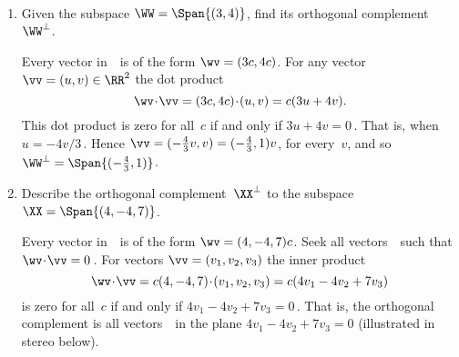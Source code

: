 \begin{example} \label{eg:orthsubsp}
\ 
\begin{enumerate}
\item\label{eg:orthsubsp:a} Given the subspace \(\WW=\Span\{(3,4)\}\), find its orthogonal complement \(\WW^\perp\). 
\begin{solution} 
Every vector in~\WW\ is of the form \(\wv=(3c,4c)\).
%
For any vector \(\vv=(u,v)\in\RR^2\) the dot product 
\begin{equation*}
\wv\cdot\vv
=(3c,4c)\cdot(u,v)
=c(3u+4v).
\end{equation*}
This dot product is zero for all~\(c\) if and only if \(3u+4v=0\)\,. 
That is, when \(u=-4v/3\)\,. 
Hence \(\vv=(-\tfrac43v,v)=(-\tfrac43,1)v\), for every~\(v\), and so \(\WW^\perp=\Span\{(-\tfrac43,1)\}\).
\end{solution}


\item Describe the orthogonal complement~\(\XX^\perp\) to the subspace \(\XX=\Span\{(4,-4,7)\}\).
\begin{solution} 
Every vector in~\WW\ is of the form \(\wv=(4,-4,7)c\).
Seek all vectors~\vv\ such that \(\wv\cdot\vv=0\)\,.  
For vectors \(\vv=(v_1,v_2,v_3)\) the inner product
\begin{equation*}
\wv\cdot\vv
=c(4,-4,7)\cdot(v_1,v_2,v_3)
=c(4v_1-4v_2+7v_3)
\end{equation*}
is zero for all~\(c\) if and only if \(4v_1-4v_2+7v_3=0\)\,. 
That is, the orthogonal complement is all vectors~\vv\ in the plane \(4v_1-4v_2+7v_3=0\)  (illustrated in stereo below).
\begin{center}
\end{center}
\end{solution}



\end{enumerate}
\end{example}
